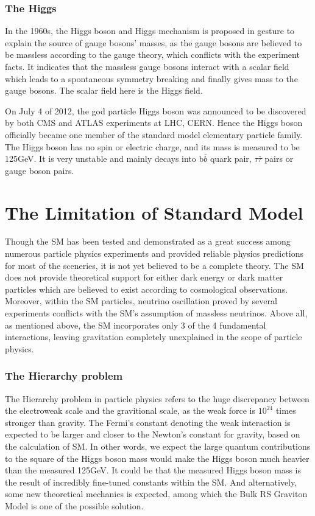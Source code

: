 \subsubsection{The Higgs}
In the 1960s, the Higgs boson and Higgs mechanism is proposed in gesture to explain the source of gauge bosons' masses\cite{higgstheory1}\cite{higgstheory2}\cite{higgstheory3}, as the gauge bosons are believed to be massless according to the gauge theory, which conflicts with the experiment facts. It indicates that the massless gauge bosons interact with a scalar field which leads to a spontaneous symmetry breaking and finally gives mass to the gauge bosons. The scalar field here is the Higgs field. 

\vspace{0.3cm}
On July 4 of 2012, the god particle Higgs boson was announced to be discovered by both CMS and ATLAS experiments at LHC, CERN\cite{higgsdiscover1}\cite{higgsdiscover2}. Hence the Higgs boson officially became one member of the standard model elementary particle family. The Higgs boson has no spin or electric charge, and its mass is measured to be 125GeV. It is very unstable and mainly decays into b$\bar{b}$ quark pair, $\tau\bar{\tau}$ pairs or gauge boson pairs.

\section{The Limitation of Standard Model}
Though the SM has been tested and demonstrated as a great success among numerous particle physics experiments and provided reliable physics predictions for most of the sceneries, it is not yet believed to be a complete theory. The SM does not provide theoretical support for either dark energy or dark matter particles which are believed to exist according to cosmological observations. Moreover, within the SM particles, neutrino oscillation proved by several experiments conflicts with the SM's assumption of massless neutrinos. Above all, as mentioned above, the SM incorporates only 3 of the 4 fundamental interactions, leaving gravitation completely unexplained in the scope of particle physics.
\subsubsection{The Hierarchy problem}
The Hierarchy problem in particle physics refers to the huge discrepancy between the electroweak scale and the gravitional scale, as the weak force is $10^{24}$ times stronger than gravity. The Fermi's constant denoting the weak interaction is expected to be larger and closer to the Newton's constant for gravity, based on the calculation of SM. In other words, we expect the large quantum contributions to the square of the Higgs boson mass would make the Higgs boson much heavier than the measured 125GeV. It could be that the measured Higgs boson mass is the result of incredibly fine-tuned constants within the SM. And alternatively, some new theoretical mechanics is expected, among which the Bulk RS Graviton Model is one of the possible solution.

